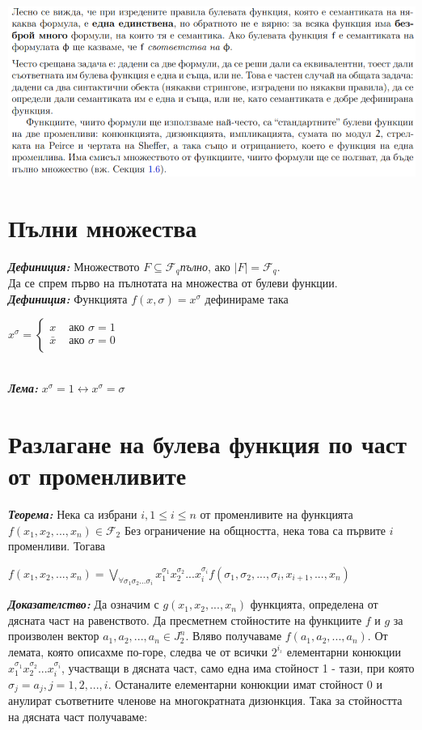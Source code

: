 \documentclass[11pt]{article} %
\newcommand{\italicBold}[1]{\textbf{\emph{#1}}}
\newcommand{\definition}{\italicBold{Дефиниция: }}
\newcommand{\theorem}{\italicBold{Теорема: }}
\newcommand{\lemma}{\italicBold{Лема: }}
\newcommand{\proof}{\italicBold{Доказателство: }}
\begin{document}
\includegraphics[scale=0.85]{AlternativeFormula3.png}\\
\restoregeometry

\section{Пълни множества}
\definition Множеството $F \subseteq \mathcal{F}_{q}$\textit{пълно}, ако $|F| = \mathcal{F}_{q}$.\\

Да се спрем първо на пълнотата на множества от булеви функции. \\

\definition Функцията $f(x, \sigma) = x ^{\sigma}$ дефинираме така \\
\centerline{$x^{\sigma} = 
	\begin{cases}
		x & \text{ ако } \sigma = 1 \\
		\bar{x} & \text{ ако } \sigma = 0 \\
	\end{cases}
$}\\
\lemma $x^{\sigma} = 1 \leftrightarrow x^{\sigma} = \sigma$

\section{Разлагане на булева функция по част от променливите}
\theorem Нека са избрани $i, 1 \leq i \leq n$ от променливите на функцията $f(x_{1}, x_{2}, ..., x_{n}) \in \mathcal{F}_{2}$ Без ограничение на общността, нека това са първите $i$ променливи. Тогава \\

\centerline{$f(x_{1}, x_{2}, ..., x_{n}) = \underset{\forall \sigma_{1}\sigma_{2}...\sigma_{i}}{\bigvee} x_{1}^{\sigma_1}x_{2}^{\sigma_2} ... x_{i}^{\sigma_i} f(\sigma_{1}, \sigma_{2}, ..., \sigma_{i}, x_{i+1}, ..., x_{n})$}

\proof Да означим с $g(x_{1}, x_{2}, ..., x_{n})$ функцията, определена от дясната част на равенството. Да пресметнем стойностите на функциите $f$ и $g$ за произволен вектор $a_{1}, a_{2}, ..., a_{n} \in J^{n}_{2}$. Вляво получаваме $f(a_{1}, a_{2}, ..., a_{n})$. От лемата, която описахме по-горе, следва че от всички $2^{i_\iota}$ елементарни конюкции $x_{1}^{\sigma_1} x_{2}^{\sigma_2} ... x_{i}^{\sigma_i}$, участващи в дясната част, само една има стойност 1 - тази, при която $\sigma_{j} = a_{j}, j = 1, 2, ..., i$. Останалите елементарни конюкции имат стойност 0 и анулират съответните членове на многократната дизюнкция. Така за стойността на дясната част получаваме: \\
\end{document}
